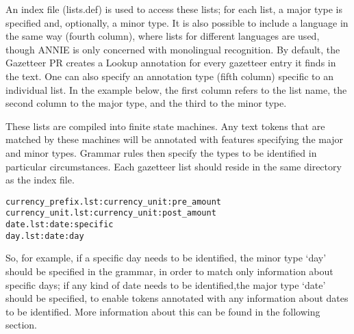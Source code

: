 An index file (lists.def) is used to access these lists; for each list, a
major type is specified and, optionally, a minor type. It is also
possible to include a language in the same way (fourth column), 
where lists for different languages are used, though ANNIE is 
only concerned with monolingual recognition.  By default, the 
Gazetteer PR creates a Lookup annotation for every gazetteer
entry it finds in the text.  One can also specify an annotation type
(fifth column) specific to an individual list.  In the example below, 
the first column refers to the list name, the second column to the
major type, and the third to the minor type.

These lists are compiled into finite state machines. Any text tokens
that are matched by these machines will be annotated with features
specifying the major and minor types. Grammar rules then specify
the types to be identified in particular circumstances. Each 
gazetteer list should reside in the same directory as the index 
file.

\begin{small}
\begin{verbatim}
currency_prefix.lst:currency_unit:pre_amount
currency_unit.lst:currency_unit:post_amount
date.lst:date:specific
day.lst:date:day
\end{verbatim}
\end{small}

So, for example, if a specific day needs to be identified, the minor
type `day' should be specified in the grammar, in order to match 
only information about specific days; if any kind of date needs to be
identified,the major type `date' should be specified, to enable tokens
annotated with any information about dates to be identified. More
information about this can be found in the following section.

